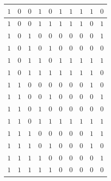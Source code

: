 \documentclass[12pt,a4paper]{report}
\begin{document}
\begin{tabular}{|c|cc|cc||c|cccc|}
    \hline
    $1$ & $0$ & $0$ & $1$ & $0$ & $1$ & $1$ & $1$ & $1$ & $0$\\
    \hline
    $1$ & $0$ & $0$ & $1$ & $1$ & $1$ & $1$ & $1$ & $0$ & $1$\\
    \hline
    $1$ & $0$ & $1$ & $0$ & $0$ & $0$ & $0$ & $0$ & $0$ & $1$\\
    \hline
    $1$ & $0$ & $1$ & $0$ & $1$ & $0$ & $0$ & $0$ & $0$ & $0$\\
    \hline
    $1$ & $0$ & $1$ & $1$ & $0$ & $1$ & $1$ & $1$ & $1$ & $1$\\
    \hline
    $1$ & $0$ & $1$ & $1$ & $1$ & $1$ & $1$ & $1$ & $1$ & $0$\\
    \hline
    $1$ & $1$ & $0$ & $0$ & $0$ & $0$ & $0$ & $0$ & $1$ & $0$\\
    \hline
    $1$ & $1$ & $0$ & $0$ & $1$ & $0$ & $0$ & $0$ & $0$ & $1$\\
    \hline
    $1$ & $1$ & $0$ & $1$ & $0$ & $0$ & $0$ & $0$ & $0$ & $0$\\
    \hline
    $1$ & $1$ & $0$ & $1$ & $1$ & $1$ & $1$ & $1$ & $1$ & $1$\\
    \hline
    $1$ & $1$ & $1$ & $0$ & $0$ & $0$ & $0$ & $0$ & $1$ & $1$\\
    \hline
    $1$ & $1$ & $1$ & $0$ & $1$ & $0$ & $0$ & $0$ & $1$ & $0$\\
    \hline
    $1$ & $1$ & $1$ & $1$ & $0$ & $0$ & $0$ & $0$ & $0$ & $1$\\
    \hline
    $1$ & $1$ & $1$ & $1$ & $1$ & $0$ & $0$ & $0$ & $0$ & $0$\\
    \hline
\end{tabular}
\newpage
\end{document}
